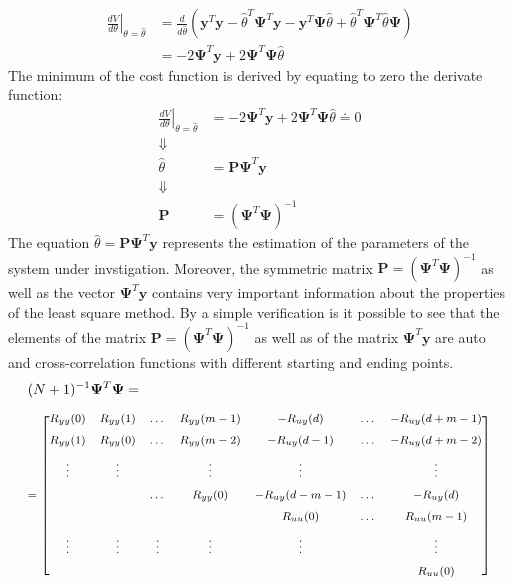 \documentclass[11pt,a4paper,oneside]{book}
\numberwithin{equation}{section}
\theoremstyle{it}
\theoremstyle{definition}
\begin{document}
\begin{equation}\label{eq:15}
	\begin{aligned}
		\left.\frac{dV}{d\theta} \right|_{\theta=\hat{\theta}} &= 
		\frac{d}{d\hat{\theta}} \left( 
		\mathbf{y}^T\mathbf{y}-\hat{\theta}^T\mathbf{\Psi}^T\mathbf{y}-\mathbf{y}^T\mathbf{\Psi}\hat{\theta}+\hat{\theta}^T\mathbf{\Psi}^T\hat{\theta}\mathbf{\Psi}
		 \right) \\
		&= -2\mathbf{\Psi}^T\mathbf{y}+2\mathbf{\Psi}^T\mathbf{\Psi}\hat{\theta}
	\end{aligned}
\end{equation}
The minimum of the cost function is derived by equating to zero the derivate 
function:
\begin{equation}\label{eq:16}
	\boxed{
		\begin{aligned}
			\left.\frac{dV}{d\theta} \right|_{\theta=\hat{\theta}} &= 
			-2\mathbf{\Psi}^T\mathbf{y}+2\mathbf{\Psi}^T\mathbf{\Psi}\hat{\theta}
			 \doteq 0 \\[6pt]
			\Downarrow & \\[6pt]
			\hat{\theta}&= \mathbf{P}\mathbf{\Psi}^T\mathbf{y} \\[6pt]
			\Downarrow & \\[6pt]
			\mathbf{P} &= \left(\mathbf{\Psi}^T\mathbf{\Psi}\right)^{-1}
		\end{aligned}
	}
\end{equation}
The equation $\hat{\theta}= \mathbf{P}\mathbf{\Psi}^T\mathbf{y}$ represents the 
estimation of the parameters of the system under invstigation. Moreover, the 
symmetric matrix $\mathbf{P} = \left(\mathbf{\Psi}^T\mathbf{\Psi}\right)^{-1}$ 
as well as the vector $\mathbf{\Psi}^T\mathbf{y}$ contains very important 
information about the properties of the least square method.
By a simple verification is it possible to see that the elements of the matrix 
$\mathbf{P} = \left(\mathbf{\Psi}^T\mathbf{\Psi}\right)^{-1}$ as well as of the 
matrix $\mathbf{\Psi}^T\mathbf{y}$ are auto and cross-correlation functions 
with different starting and ending points.
\begin{equation*}
	\begin{aligned}
		& (N+1)^{-1}\mathbf{\Psi}^T\mathbf{\Psi} = \\[6pt]
		&
		\mbox{\footnotesize
			$=	\begin{bmatrix}
				R_{yy}(0) & R_{yy}(1) & \dots & R_{yy}(m-1) & -R_{uy}(d) & 
				\dots & -R_{uy}(d+m-1) \\[6pt]
				R_{yy}(1) & R_{yy}(0) & \dots & R_{yy}(m-2) & -R_{uy}(d-1) & 
				\dots & -R_{uy}(d+m-2) \\[6pt]
				\vdots & \vdots &  & \vdots & \vdots &  & \vdots \\[6pt]
				&  & \dots & R_{yy}(0) & -R_{uy}(d-m-1) & \dots & -R_{uy}(d) 
				\\[6pt]
				&  &  &  & R_{uu}(0) & \dots & R_{uu}(m-1) \\[6pt]
				\vdots & \vdots & \vdots & \vdots & \vdots &  & \vdots \\[6pt]
				&  &  &  &  & & R_{uu}(0)	
			\end{bmatrix} $}
	\end{aligned}
\end{equation*}
\end{document}
